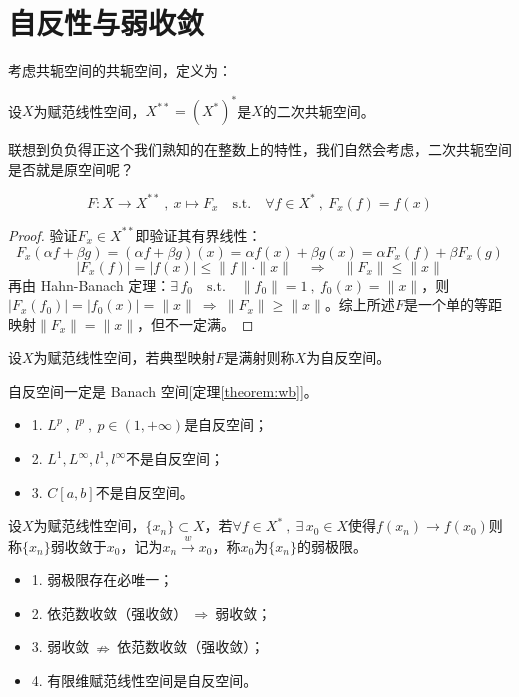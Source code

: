 \newpage
\section{自反性与弱收敛}\label{selfback}
考虑共轭空间的共轭空间，定义为：
\begin{definition}[二次共轭空间]
    设$X$为赋范线性空间，$X^{**}=(X^*)^*$是$X$的二次共轭空间。
\end{definition}
联想到负负得正这个我们熟知的在整数上的特性，我们自然会考虑，二次共轭空间是否就是原空间呢？
\begin{definition}[典型映射]
\[F:X \to X^{**} \ , \ x \mapsto F_x \quad \text{s.t.} \quad \forall f \in X^* \ , \ F_x(f)=f(x)\]
\end{definition}
\begin{proof}验证$F_x \in X^{**}$即验证其有界线性：
\[F_x(\alpha f+\beta g)=(\alpha f+\beta g)(x)=\alpha f(x)+\beta g(x)=\alpha F_x(f)+\beta F_x(g)\]
\[|F_x(f)|=|f(x)| \leq \|f\| \cdot \|x\| \quad \Rightarrow \quad \|F_x\| \leq \|x\|\]
再由 Hahn-Banach 定理：$\exists \, f_0 \quad \text{s.t.} \quad \|f_0\|=1 \ , \ f_0(x)=\|x\|$，则$|F_x(f_0)|=|f_0(x)|=\|x\| \ \Rightarrow \ \|F_x\| \geq \|x\|$。综上所述$F$是一个单的等距映射$\|F_x\|=\|x\|$，但不一定满。
\end{proof}
\begin{definition}[自反空间]
设$X$为赋范线性空间，若典型映射$F$是满射则称$X$为自反空间。
\end{definition}
\begin{remark}
\quad 自反空间一定是 Banach 空间[定理\ref{theorem:wb}]。
\end{remark}
\begin{proposition}
\begin{itemize}
    \item 1. $L^p \ , \ l^p \ , \ p \in (1,+\infty)$是自反空间；
    \item 2. $L^1,L^{\infty},l^1,l^{\infty}$不是自反空间；
    \item 3. $C[a,b]$不是自反空间。
\end{itemize}
\end{proposition}
\begin{definition}[弱收敛]
设$X$为赋范线性空间，$\{x_n\} \subset X$，若$\forall f \in X^* \ , \ \exists \, x_0 \in X$使得$f(x_n) \to f(x_0)$则称$\{x_n\}$弱收敛于$x_0$，记为$x_n \xrightarrow{w} x_0$，称$x_0$为$\{x_n\}$的弱极限。
\end{definition}
\begin{lemma}\label{lemma:rsl}
\begin{itemize}
    \item 1. 弱极限存在必唯一；
    \item 2. 依范数收敛（强收敛）$ \ \Rightarrow \ $弱收敛；
    \item 3. 弱收敛$ \ \nRightarrow \ $依范数收敛（强收敛）；
    \item 4. 有限维赋范线性空间是自反空间。
\end{itemize}
\end{lemma}
